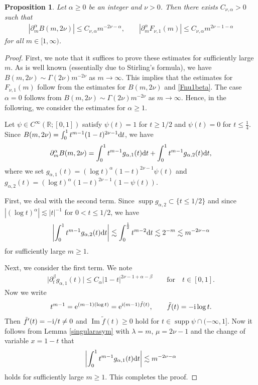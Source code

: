 \documentclass[10pt,a4paper]{amsart}
\numberwithin{equation}{section}
\newtheorem{Proposition}[Theorem]{Proposition}
 { \theoremstyle{definition}
\newtheorem{Definition}[Theorem]{Definition}
\newtheorem{Note}[Theorem]{Note}
\newtheorem{Example}[Theorem]{Example}
\newtheorem{Remark}[Theorem]{Remark} }
\def\R{\mathbb{R}}%
\DeclareMathOperator{\supp}{supp}%
\DeclareMathOperator{\im}{Im}%
\def\a{\alpha}
\def\b{\beta}
\def\g{\psi}
\def\l{\lambda}
\def\m{\mu}
\def\n{\nu}
\def\pa{\partial}
\begin{document}
\begin{Proposition}\label{Fnuestimate}
Let $\a\geq 0$ be an integer and $\n>0$. Then there exists $C_{\n,\a}>0$ such that
\begin{align*}
|\pa_m^{\a}B(m,2\n)|\leq C_{\n,\a}m^{-2\n-\a},\qquad |\pa_m^{\a}F_{\n,1}(m)|\leq C_{\n,\a}m^{2\n-1-\a}
\end{align*}
for all $m\in [1,\infty)$.
\end{Proposition}

\begin{proof}First, we note that it suffices to prove these estimates for sufficiently large $m$. As is well known (essentially due to Stirling's formula), we have $B(m,2\n)\sim \Gamma(2\n)m^{-2\n}$ as $m\to \infty$.
This implies that the estimates for $F_{\n,1}(m)$ follow from the estimates for $B(m,2\n)$ and \eqref{Fnu1beta}. The case $\a=0$ follows from $B(m,2\n)\sim \Gamma(2\n)m^{-2\n}$ as $m\to \infty$. Hence, in the following, we consider the estimates for $\a\geq 1$.

Let $\g\in C^{\infty}(\R;[0,1])$ satisfy $\g(t)=1$ for $t\geq 1/2$ and $\g(t)=0$ for $t\leq \frac{1}{4}$.
Since $B(m,2\n)=\int_0^1t^{m-1}(1-t)^{2\n-1}{\rm d}t$, we have
\begin{align*}
\pa_m^{\a}B(m,2\n)=\int_0^1t^{m-1}g_{\a,1}(t){\rm d}t+\int_0^1t^{m-1}g_{\a,2}(t){\rm d}t,
\end{align*}
where we set $g_{\a,1}(t)=(\log t)^{\a}(1-t)^{2\n-1}\g(t)$ and $g_{\a,2}(t)=(\log t)^{\a}(1-t)^{2\n-1}(1-\g(t))$.

First, we deal with the second term. Since $\supp g_{\a,2}\subset \{t\leq 1/2\}$ and since $|(\log t)^{\a}|\lesssim |t|^{-1}$ for $0<t\leq 1/2$, we have
\begin{align*}
\left|\int_0^1t^{m-1}g_{\a,2}(t){\rm d}t\right|\lesssim \int_0^{\frac{1}{2}}t^{m-2}{\rm d}t\lesssim 2^{-m}\lesssim m^{-2\n-\a}
\end{align*}
for sufficiently large $m\geq 1$.

Next, we consider the first term. We note
\begin{align*}
\big|\pa_{t}^{\b}g_{\a,1}(t)\big|\leq C_{\a}|1-t|^{2\n-1+\a-\b}\qquad\text{for}\quad t\in [0,1].
\end{align*}
Now we write
\begin{align*}
t^{m-1}={\rm e}^{(m-1)(\log t)}={\rm e}^{{\rm i}(m-1)\tilde{f}(t)},\qquad \tilde{f}(t)=-{\rm i}\log t.
\end{align*}
Then $\tilde{f}'(t)=-{\rm i}/t\neq 0$ and $\im \tilde{f}(t)\geq 0$ hold for $t\in \supp \g\cap (-\infty,1]$.
Now it follows from Lemma \ref{singularasym} with $\l=m$, $\m=2\n-1$ and the change of variable $x=1-t$ that
\begin{align*}
\left|\int_0^1t^{m-1}g_{\a,1}(t){\rm d}t\right|\lesssim m^{-2\n-\a}
\end{align*}
holds for sufficiently large $m\geq 1$. This completes the proof.
\end{proof}
\end{document}
